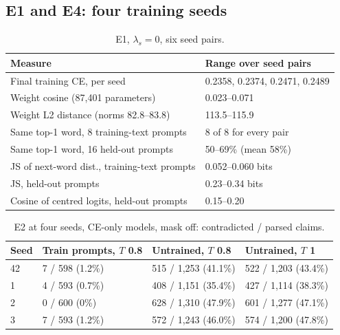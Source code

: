 \documentclass[letterpaper, 10pt, conference]{IEEEtran}
\begin{document}
\subsection{E1 and E4: four training seeds}\label{sec:e14}
\begin{table}[t]
\caption{E1, $\lambda_s{=}0$, six seed pairs.}\label{tab:e1}
\centering\footnotesize\setlength{\tabcolsep}{3pt}
\begin{tabular}{@{}L{4.6cm}L{3.3cm}@{}}
\toprule
Measure & Range over seed pairs\\
\midrule
Final training CE, per seed & 0.2358, 0.2374, 0.2471, 0.2489\\
Weight cosine (87,401 parameters) & 0.023--0.071\\
Weight L2 distance (norms 82.8--83.8) & 113.5--115.9\\
Same top-1 word, 8 training-text prompts & 8 of 8 for every pair\\
Same top-1 word, 16 held-out prompts & 50--69\% (mean 58\%)\\
JS of next-word dist., training-text prompts & 0.052--0.060 bits\\
JS, held-out prompts & 0.23--0.34 bits\\
Cosine of centred logits, held-out prompts & 0.15--0.20\\
\bottomrule
\end{tabular}
\end{table}

\begin{table}[t]
\caption{E2 at four seeds, CE-only models, mask off: contradicted / parsed claims.}\label{tab:e2seeds}
\centering\footnotesize\setlength{\tabcolsep}{3pt}
\begin{tabular}{@{}llll@{}}
\toprule
Seed & Train prompts, $T$ 0.8 & Untrained, $T$ 0.8 & Untrained, $T$ 1\\
\midrule
42 & 7 / 598 (1.2\%) & 515 / 1,253 (41.1\%) & 522 / 1,203 (43.4\%)\\
1 & 4 / 593 (0.7\%) & 408 / 1,151 (35.4\%) & 427 / 1,114 (38.3\%)\\
2 & 0 / 600 (0\%) & 628 / 1,310 (47.9\%) & 601 / 1,277 (47.1\%)\\
3 & 7 / 593 (1.2\%) & 572 / 1,243 (46.0\%) & 574 / 1,200 (47.8\%)\\
\bottomrule
\end{tabular}
\end{table}
\end{document}
